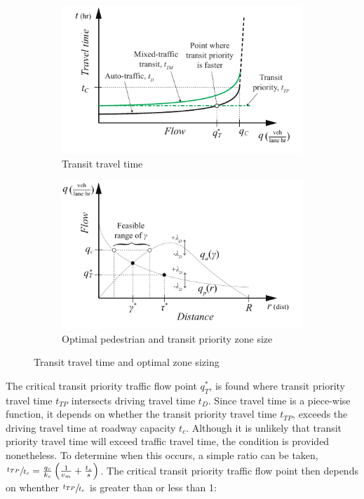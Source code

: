 \documentclass{article}
\begin{document}
\begin{figure}[!ht]
     \centering
     \hfill
     \begin{subfigure}[b]{0.45\textwidth}
         \centering
         \includegraphics[width=\textwidth]{diagram_transit_traveltime}
        \caption{Transit travel time}
         \label{fig:transittraveltime}
     \end{subfigure}
     \hfill
     \begin{subfigure}[b]{0.45\textwidth}
         \centering
         \includegraphics[width=\textwidth]{diagram_flow_combo}
         \caption{Optimal pedestrian and transit priority zone size}
         \label{fig:flowcombo}
     \end{subfigure}
     \hfill
     \caption{Transit travel time and optimal zone sizing}
\end{figure}

The critical transit priority traffic flow point $q^*_T$, is found where transit priority travel time $t_{TP}$ intersects driving travel time $t_D$. Since travel time is a piece-wise function, it depends on whether the transit priority travel time $t_{TP}$, exceeds the driving travel time at roadway capacity $t_c$. Although it is unlikely that transit priority travel time will exceed traffic travel time, the condition is provided nonetheless. To determine when this occurs, a simple ratio can be taken, $\sfrac{t_{TP}}{t_c} = \frac{q_c}{k_c} \left( \frac{1}{v_m} + \frac{t_s}{s} \right)$. The critical transit priority traffic flow point then depends on whenther $\sfrac{t_{TP}}{t_c}$ is greater than or less than 1:
\end{document}
